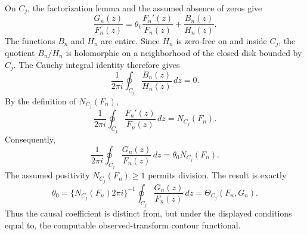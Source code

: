On \(C_j\), the factorization lemma and the assumed absence of zeros give
\[
 \frac{G_n(z)}{F_n(z)}
 =\theta_0\frac{F_n'(z)}{F_n(z)}+\frac{B_n(z)}{H_n(z)}.
\]
The functions \(B_n\) and \(H_n\) are entire.  Since \(H_n\) is zero-free on and inside \(C_j\), the quotient \(B_n/H_n\) is holomorphic on a neighborhood of the closed disk bounded by \(C_j\).  The Cauchy integral identity therefore gives
\[
 \frac{1}{2\pi i}\oint_{C_j}\frac{B_n(z)}{H_n(z)}\,dz=0.
\]
By the definition of \(N_{C_j}(F_n)\),
\[
 \frac{1}{2\pi i}\oint_{C_j}\frac{F_n'(z)}{F_n(z)}\,dz=N_{C_j}(F_n).
\]
Consequently,
\[
 \frac{1}{2\pi i}\oint_{C_j}\frac{G_n(z)}{F_n(z)}\,dz
 =\theta_0N_{C_j}(F_n).
\]
The assumed positivity \(N_{C_j}(F_n)\ge1\) permits division.  The result is exactly
\[
 \theta_0
 =\{N_{C_j}(F_n)2\pi i\}^{-1}
   \oint_{C_j}\frac{G_n(z)}{F_n(z)}\,dz
 =\Theta_{C_j}(F_n,G_n).
\]
Thus the causal coefficient is distinct from, but under the displayed conditions equal to, the computable observed-transform contour functional.